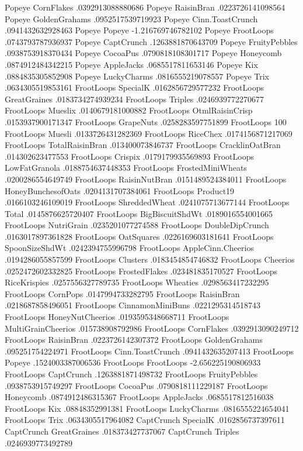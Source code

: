 Popeye	CornFlakes	.0392913088880686
Popeye	RaisinBran	.0223726141098564
Popeye	GoldenGrahams	.0952517539719923
Popeye	Cinn.ToastCrunch	.0941432632928463
Popeye	Popeye	-1.216769746782102
Popeye	FrootLoops	.0743793787936937
Popeye	CaptCrunch	.1263881870643709
Popeye	FruityPebbles	.0938753918370434
Popeye	CocoaPus	.0790818108301717
Popeye	Honeycomb	.0874912484342215
Popeye	AppleJacks	.0685517811653146
Popeye	Kix	.0884835305852908
Popeye	LuckyCharms	.0816555219078557
Popeye	Trix	.0634305519853161
FrootLoops	SpecialK	.0162856729577232
FrootLoops	GreatGraines	.0183734274939234
FrootLoops	Triples	.0246939772270677
FrootLoops	Mueslix	.0140679181000882
FrootLoops	OtmlRaisinCrisp	.0153937900171347
FrootLoops	GrapeNuts	.0258283597751899
FrootLoops	100%
FrootLoops	Muesli	.0133726431282369
FrootLoops	RiceChex	.0174156871217069
FrootLoops	TotalRaisinBran	.013400073846737
FrootLoops	CracklinOatBran	.014302623477553
FrootLoops	Crispix	.0179179935569893
FrootLoops	LowFatGranola	.0188754637448353
FrootLoops	FrostedMiniWheats	.0200286554649749
FrootLoops	RaisinNutBran	.0151489524384011
FrootLoops	HoneyBunchesofOats	.0204131707384061
FrootLoops	Product19	.0166103246109019
FrootLoops	ShreddedWheat	.0241075713677144
FrootLoops	Total	.0145876625720407
FrootLoops	BigBiscuitShdWt	.0189016554001665
FrootLoops	NutriGrain	.0235201077274588
FrootLoops	DoubleDipCrunch	.0163017897361828
FrootLoops	OatSquares	.0226169603181641
FrootLoops	SpoonSizeShdWt	.0242394755996798
FrootLoops	AppleCinn.Cheerios	.0194286055857599
FrootLoops	Clusters	.0183454854746832
FrootLoops	Cheerios	.0252472602332825
FrootLoops	FrostedFlakes	.023481835170527
FrootLoops	RiceKrispies	.0257556327789735
FrootLoops	Wheaties	.0298563417232295
FrootLoops	CornPops	.0147994733282795
FrootLoops	RaisinBran	.0218687858496051
FrootLoops	CinnamonMiniBuns	.0221295314518743
FrootLoops	HoneyNutCheerios	.0193595348668711
FrootLoops	MultiGrainCheerios	.015738908792986
FrootLoops	CornFlakes	.0392913090249712
FrootLoops	RaisinBran	.0223726142307372
FrootLoops	GoldenGrahams	.095251754224971
FrootLoops	Cinn.ToastCrunch	.0941432635207413
FrootLoops	Popeye	.1524003387006536
FrootLoops	FrootLoops	-2.656225190806933
FrootLoops	CaptCrunch	.1263881871498732
FrootLoops	FruityPebbles	.0938753915749297
FrootLoops	CocoaPus	.0790818111229187
FrootLoops	Honeycomb	.0874912486315367
FrootLoops	AppleJacks	.0685517812516038
FrootLoops	Kix	.08848352991381
FrootLoops	LuckyCharms	.0816555224654041
FrootLoops	Trix	.0634305517964082
CaptCrunch	SpecialK	.0162856737397611
CaptCrunch	GreatGraines	.018373427737067
CaptCrunch	Triples	.0246939773492789
